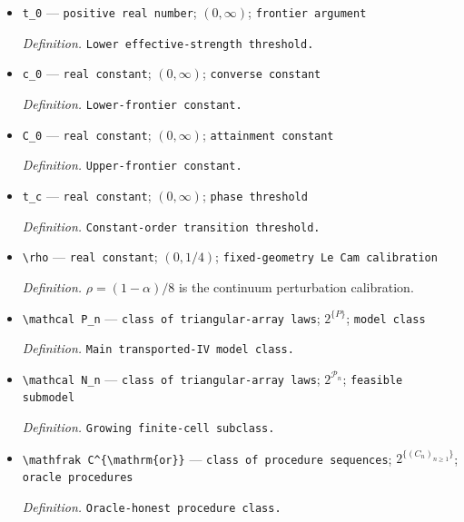 \documentclass{article}
\begin{document}
\begin{itemize}
  \par\smallskip\noindent\emph{Definition.} Lebesgue length restricted to \(\Theta\).
  \item \texttt{t\_\allowbreak{}0} --- \texttt{positive real number}; \((0,\infty)\); \texttt{frontier argument}
  \par\smallskip\noindent\emph{Definition.} \texttt{Lower effective-\allowbreak{}strength threshold.}
  \item \texttt{c\_\allowbreak{}0} --- \texttt{real constant}; \((0,\infty)\); \texttt{converse constant}
  \par\smallskip\noindent\emph{Definition.} \texttt{Lower-\allowbreak{}frontier constant.}
  \item \texttt{C\_\allowbreak{}0} --- \texttt{real constant}; \((0,\infty)\); \texttt{attainment constant}
  \par\smallskip\noindent\emph{Definition.} \texttt{Upper-\allowbreak{}frontier constant.}
  \item \texttt{t\_\allowbreak{}c} --- \texttt{real constant}; \((0,\infty)\); \texttt{phase threshold}
  \par\smallskip\noindent\emph{Definition.} \texttt{Constant-\allowbreak{}order transition threshold.}
  \item \texttt{\textbackslash{}\allowbreak{}rho} --- \texttt{real constant}; \((0,1/4)\); \texttt{fixed-\allowbreak{}geometry Le Cam calibration}
  \par\smallskip\noindent\emph{Definition.} \(\rho=(1-\alpha)/8\) is the continuum perturbation calibration.
  \item \texttt{\textbackslash{}\allowbreak{}mathcal P\_\allowbreak{}n} --- \texttt{class of triangular-\allowbreak{}array laws}; \(2^{\{P\}}\); \texttt{model class}
  \par\smallskip\noindent\emph{Definition.} \texttt{Main transported-\allowbreak{}IV model class.}
  \item \texttt{\textbackslash{}\allowbreak{}mathcal N\_\allowbreak{}n} --- \texttt{class of triangular-\allowbreak{}array laws}; \(2^{\mathcal P_n}\); \texttt{feasible submodel}
  \par\smallskip\noindent\emph{Definition.} \texttt{Growing finite-\allowbreak{}cell subclass.}
  \item \texttt{\textbackslash{}\allowbreak{}mathfrak C\textasciicircum{}\{\textbackslash{}\allowbreak{}mathrm\{or\}\allowbreak{}\}\allowbreak{}} --- \texttt{class of procedure sequences}; \(2^{\{(C_n)_{n\ge1}\}}\); \texttt{oracle procedures}
  \par\smallskip\noindent\emph{Definition.} \texttt{Oracle-\allowbreak{}honest procedure class.}

\end{itemize}
\end{document}
